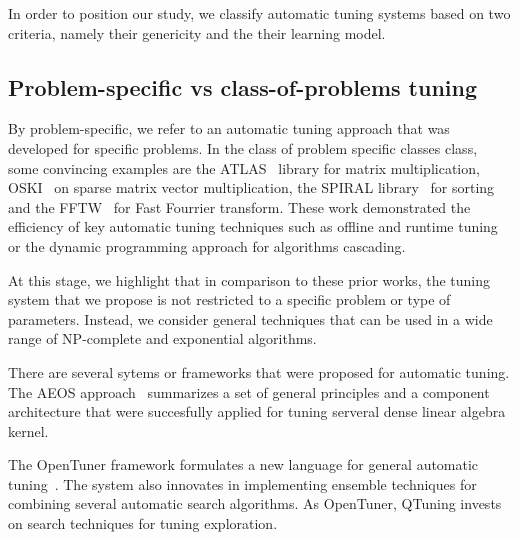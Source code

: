 \documentclass[10pt, conference, compsocconf]{IEEEtran}
\begin{document}

In order to position our study, we classify automatic tuning systems based on two criteria, namely
their genericity and the their learning model.


\subsection{Problem-specific vs class-of-problems tuning}

By problem-specific, we refer to an automatic tuning approach that was
developed for specific problems.  In the class of problem specific classes
class, some convincing examples are the ATLAS~\cite{ATLAS} library for matrix
multiplication, OSKI~\cite{Vuduc:2005zi} on sparse matrix vector
multiplication,  the SPIRAL library~\cite{Spiral} for sorting and the
FFTW~\cite{FFTW}  for Fast Fourrier transform. These work demonstrated the
efficiency of key automatic tuning techniques such as offline and runtime
tuning or the dynamic programming approach for algorithms cascading.


At this stage, we highlight that in comparison to these prior
works, the tuning system that we propose is not restricted to a specific
problem or type of parameters. Instead, we consider general techniques that can
be used in a wide range of NP-complete and exponential algorithms.

There are several sytems or frameworks that were proposed for automatic tuning.
The AEOS approach~\cite{AEOS} summarizes a set of general principles and a
component architecture that were succesfully applied for tuning  serveral dense
linear algebra kernel.


The OpenTuner framework formulates a new language for general automatic
tuning~\cite{DBLP:conf/IEEEpact/AnselKVRBOA14}.  The system also innovates in
implementing ensemble techniques for combining several automatic search
algorithms. As OpenTuner, QTuning invests on search techniques for tuning
exploration.
\end{document}
